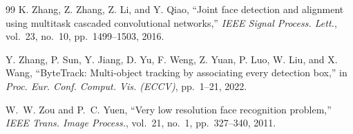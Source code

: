 \documentclass[12pt, a4paper]{article}
\begin{document}
\begin{thebibliography}{99}
K. Zhang, Z. Zhang, Z. Li, and Y. Qiao, ``Joint face detection and alignment using multitask cascaded convolutional networks,'' \textit{IEEE Signal Process. Lett.}, vol.~23, no.~10, pp.~1499--1503, 2016.

Y. Zhang, P. Sun, Y. Jiang, D. Yu, F. Weng, Z. Yuan, P. Luo, W. Liu, and X. Wang, ``ByteTrack: Multi-object tracking by associating every detection box,'' in \textit{Proc. Eur. Conf. Comput. Vis. (ECCV)}, pp.~1--21, 2022.

W.~W. Zou and P.~C. Yuen, ``Very low resolution face recognition problem,'' \textit{IEEE Trans. Image Process.}, vol.~21, no.~1, pp.~327--340, 2011.

\end{thebibliography}
\end{document}
